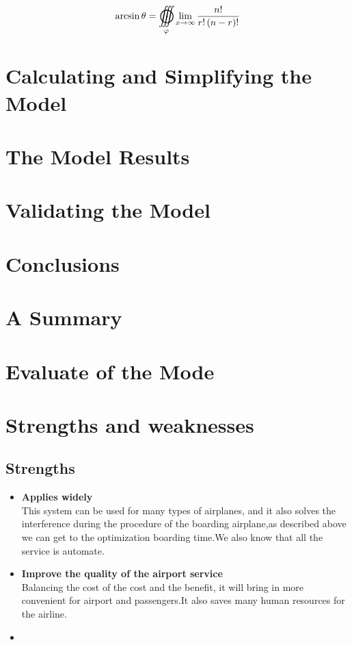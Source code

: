 \documentclass{mcmthesis}
\begin{document}
\lipsum[10]

\begin{equation}
  \arcsin \theta  =
  \mathop{{\int\!\!\!\!\!\int\!\!\!\!\!\int}\mkern-31.2mu
  \bigodot}\limits_\varphi
  {\mathop {\lim }\limits_{x \to \infty } \frac{{n!}}{{r!\left( {n - r}
  \right)!}}}
  \label{eq:demo-integral}
\end{equation}

\section{Calculating and Simplifying the Model  }
\lipsum[11]

\section{The Model Results}
\lipsum[6]

\section{Validating the Model}
\lipsum[9]

\section{Conclusions}
\lipsum[6]

\section{A Summary}
\lipsum[6]

\section{Evaluate of the Mode}

\section{Strengths and weaknesses}
\lipsum[12]

\subsection{Strengths}
\begin{itemize}
\item \textbf{Applies widely}\\
This  system can be used for many types of airplanes, and it also
solves the interference during  the procedure of the boarding
airplane,as described above we can get to the  optimization
boarding time.We also know that all the service is automate.
\item \textbf{Improve the quality of the airport service}\\
Balancing the cost of the cost and the benefit, it will bring in
more convenient  for airport and passengers.It also saves many
human resources for the airline. \item \textbf{}
\end{itemize}
\end{document}
